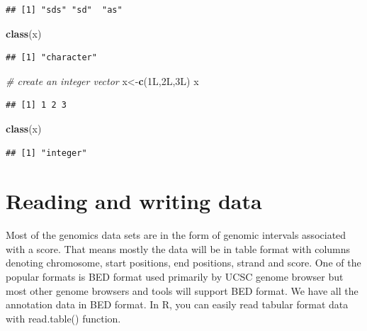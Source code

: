 \documentclass[12pt,]{krantz}
\newenvironment{Shaded}{\begin{snugshade}}{\end{snugshade}}
\newcommand{\CommentTok}[1]{\textcolor[rgb]{0.56,0.35,0.01}{\textit{#1}}}
\newcommand{\KeywordTok}[1]{\textcolor[rgb]{0.13,0.29,0.53}{\textbf{#1}}}
\newcommand{\NormalTok}[1]{#1}
\theoremstyle{definition}
\theoremstyle{definition}
\theoremstyle{definition}
\theoremstyle{remark}
\begin{document}
\begin{verbatim}
## [1] "sds" "sd"  "as"
\end{verbatim}

\begin{Shaded}
\begin{Highlighting}[]
\KeywordTok{class}\NormalTok{(x)}
\end{Highlighting}
\end{Shaded}

\begin{verbatim}
## [1] "character"
\end{verbatim}

\begin{Shaded}
\begin{Highlighting}[]
\CommentTok{# create an integer vector}
\NormalTok{x<-}\KeywordTok{c}\NormalTok{(1L,2L,3L)}
\NormalTok{x}
\end{Highlighting}
\end{Shaded}

\begin{verbatim}
## [1] 1 2 3
\end{verbatim}

\begin{Shaded}
\begin{Highlighting}[]
\KeywordTok{class}\NormalTok{(x)}
\end{Highlighting}
\end{Shaded}

\begin{verbatim}
## [1] "integer"
\end{verbatim}

\hypertarget{reading-and-writing-data}{%
\section{Reading and writing data}\label{reading-and-writing-data}}

Most of the genomics data sets are in the form of genomic intervals
associated with a score. That means mostly the data will be in table
format with columns denoting chromosome, start positions, end positions,
strand and score. One of the popular formats is BED format used
primarily by UCSC genome browser but most other genome browsers and
tools will support BED format. We have all the annotation data in BED
format. In R, you can easily read tabular format data with read.table()
function.
\end{document}
